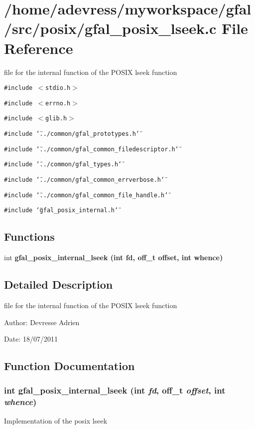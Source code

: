 \section{/home/adevress/myworkspace/gfal/src/posix/gfal\_\-posix\_\-lseek.c File Reference}
\label{gfal__posix__lseek_8c}
file for the internal function of the POSIX lseek function 

{\tt \#include $<$stdio.h$>$}\par
{\tt \#include $<$errno.h$>$}\par
{\tt \#include $<$glib.h$>$}\par
{\tt \#include \char`\"{}../common/gfal\_\-prototypes.h\char`\"{}}\par
{\tt \#include \char`\"{}../common/gfal\_\-common\_\-filedescriptor.h\char`\"{}}\par
{\tt \#include \char`\"{}../common/gfal\_\-types.h\char`\"{}}\par
{\tt \#include \char`\"{}../common/gfal\_\-common\_\-errverbose.h\char`\"{}}\par
{\tt \#include \char`\"{}../common/gfal\_\-common\_\-file\_\-handle.h\char`\"{}}\par
{\tt \#include \char`\"{}gfal\_\-posix\_\-internal.h\char`\"{}}\par
\subsection*{Functions}
\begin{CompactItemize}
\item 
int \bf{gfal\_\-posix\_\-internal\_\-lseek} (int fd, off\_\-t offset, int whence)
\end{CompactItemize}


\subsection{Detailed Description}
file for the internal function of the POSIX lseek function 

\begin{Desc}
\item[Author:]Devresse Adrien \end{Desc}
\begin{Desc}
\item[Date:]18/07/2011 \end{Desc}


\subsection{Function Documentation}
\subsubsection{\setlength{\rightskip}{0pt plus 5cm}int gfal\_\-posix\_\-internal\_\-lseek (int {\em fd}, off\_\-t {\em offset}, int {\em whence})}\label{gfal__posix__lseek_8c_dc5f1f6e23db605ce3687110e96e03be}


Implementation of the posix lseek 